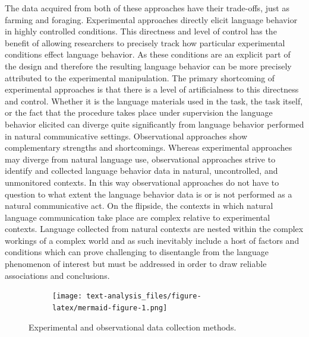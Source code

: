 \documentclass[
  letterpaper,
]{latex/krantz}
\begin{document}
The data acquired from both of these approaches have their trade-offs,
just as farming and foraging. Experimental approaches directly elicit
language behavior in highly controlled conditions. This directness and
level of control has the benefit of allowing researchers to precisely
track how particular experimental conditions effect language behavior.
As these conditions are an explicit part of the design and therefore the
resulting language behavior can be more precisely attributed to the
experimental manipulation. The primary shortcoming of experimental
approaches is that there is a level of artificialness to this directness
and control. Whether it is the language materials used in the task, the
task itself, or the fact that the procedure takes place under
supervision the language behavior elicited can diverge quite
significantly from language behavior performed in natural communicative
settings. Observational approaches show complementary strengths and
shortcomings. Whereas experimental approaches may diverge from natural
language use, observational approaches strive to identify and collected
language behavior data in natural, uncontrolled, and unmonitored
contexts. In this way observational approaches do not have to question
to what extent the language behavior data is or is not performed as a
natural communicative act. On the flipside, the contexts in which
natural language communication take place are complex relative to
experimental contexts. Language collected from natural contexts are
nested within the complex workings of a complex world and as such
inevitably include a host of factors and conditions which can prove
challenging to disentangle from the language phenomenon of interest but
must be addressed in order to draw reliable associations and
conclusions.

\begin{figure}

{\centering 

\begin{figure}[H]

{\centering \texttt{[image: text-analysis\_files/figure-latex/mermaid-figure-1.png]}

}

\end{figure}

}

\caption{\label{fig-data-colletion-methods}Experimental and
observational data collection methods.}

\end{figure}
\end{document}
